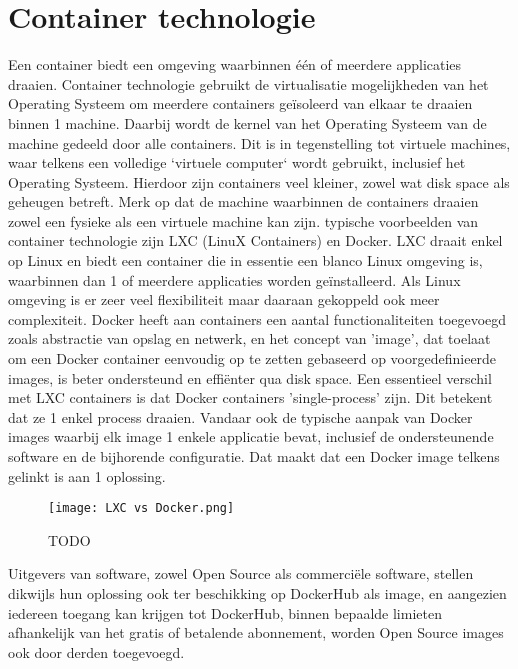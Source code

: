 \section{Container technologie}
Een container biedt een omgeving waarbinnen één of meerdere applicaties draaien. Container technologie gebruikt de virtualisatie mogelijkheden van het Operating Systeem om meerdere containers geïsoleerd van elkaar te draaien binnen 1 machine. Daarbij wordt de kernel van het Operating Systeem van de machine gedeeld door alle containers.
\newline
Dit is in tegenstelling tot virtuele machines, waar telkens een volledige `virtuele computer` wordt gebruikt, inclusief het Operating Systeem. Hierdoor zijn containers veel kleiner, zowel wat disk space als geheugen betreft.
\newline
Merk op dat de machine waarbinnen de containers draaien zowel een fysieke als een virtuele machine kan zijn.
 typische voorbeelden van container technologie zijn LXC (LinuX Containers) en Docker.
\newline
LXC draait enkel op Linux en biedt een container die in essentie een blanco Linux omgeving is, waarbinnen dan 1 of meerdere applicaties worden geïnstalleerd. Als Linux omgeving is er zeer veel flexibiliteit maar daaraan gekoppeld ook meer complexiteit.
\newline
Docker heeft aan containers een aantal functionaliteiten toegevoegd zoals abstractie van opslag en netwerk, en het concept van 'image', dat toelaat om een Docker container eenvoudig op te zetten gebaseerd op voorgedefinieerde images, is beter ondersteund en effiënter qua disk space.
\newline
Een essentieel verschil met LXC containers is dat Docker containers 'single-process' zijn. Dit betekent dat ze 1 enkel process draaien. Vandaar ook de typische aanpak van Docker images waarbij elk image 1 enkele applicatie bevat, inclusief de ondersteunende software en de bijhorende configuratie. Dat maakt dat een Docker image telkens gelinkt is aan 1 oplossing.
\newline
\begin{figure}
    \texttt{[image: LXC vs Docker.png]}
    \caption{TODO   \autocite{Kahuha2023}}
\end{figure}
\newline
\newline
Uitgevers van software, zowel Open Source als commerciële software, stellen dikwijls hun oplossing ook ter beschikking op DockerHub als image, en aangezien iedereen toegang kan krijgen tot DockerHub, binnen bepaalde limieten afhankelijk van het gratis of betalende abonnement, worden Open Source images ook door derden toegevoegd.
